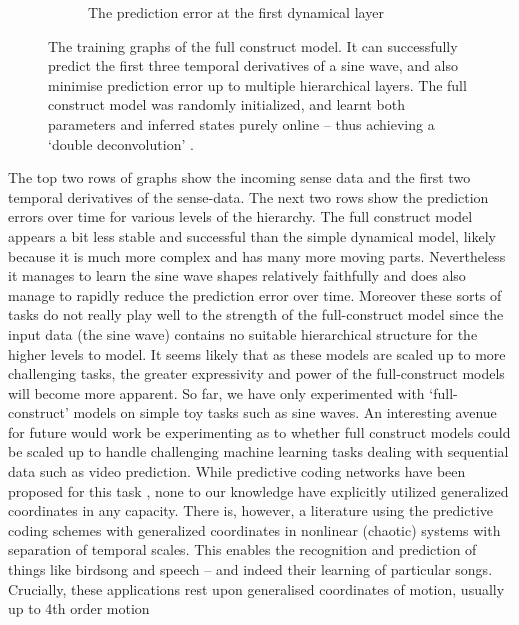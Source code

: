 \begin{figure}[H]
\begin{subfigure}{.3\linewidth}
 \caption{The prediction error at the first dynamical layer}%
\end{subfigure}
 \hfill
\caption{The training graphs of the full construct model. It can successfully predict the first three temporal derivatives of a sine wave, and also minimise prediction error up to multiple hierarchical layers. The full construct model was randomly initialized, and learnt both parameters and inferred states purely online -- thus achieving a `double deconvolution' \citep{friston2008DEM}.}
\end{figure}

The top two rows of graphs show the incoming sense data and the first two temporal derivatives of the sense-data. The next two rows show the prediction errors over time for various levels of the hierarchy. The full construct model appears a bit less stable and successful than the simple dynamical model, likely because it is much more complex and has many more moving parts. Nevertheless it manages to learn the sine wave shapes relatively faithfully and does also manage to rapidly reduce the prediction error over time. Moreover these sorts of tasks do not really play well to the strength of the full-construct model since the input data (the sine wave) contains no suitable hierarchical structure for the higher levels to model. It seems likely that as these models are scaled up to more challenging tasks, the greater expressivity and power of the full-construct models will become more apparent. So far, we have only experimented with `full-construct' models on simple toy tasks such as sine waves. An interesting avenue for future would work be experimenting as to whether full construct models could be scaled up to handle challenging machine learning tasks dealing with sequential data such as video prediction. While predictive coding networks have been proposed for this task \citep{lotter2016deep}, none to our knowledge have explicitly utilized generalized coordinates in any capacity. There is, however, a literature using the predictive coding schemes with generalized coordinates in nonlinear (chaotic) systems with separation of temporal scales. This enables the recognition and prediction of things like birdsong and speech – and indeed their learning of particular songs. Crucially, these applications rest upon generalised coordinates of motion, usually up to 4th order motion \citep{friston2009predictive,friston2015duet,isomura2019Bayesian}
